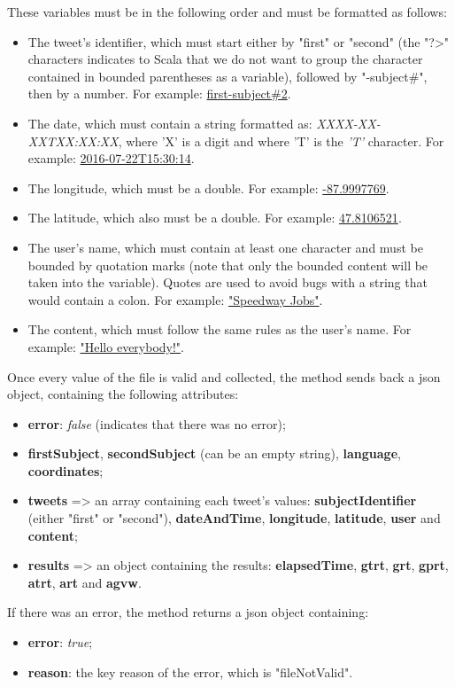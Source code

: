 \documentclass[a4paper,11pt]{report}
\begin{document}
These variables must be in the following order and must be formatted as follows:
\begin{itemize}
	\item The tweet's identifier, which must start either by "first" or "second" (the "?>" characters indicates to Scala that we do not want to group the character contained in bounded parentheses as a variable), followed by "-subject\#", then by a number. For example: \underline{first-subject\#2}.
	\item The date, which must contain a string formatted as: \emph{XXXX-XX-XXTXX:XX:XX}, where 'X' is a digit and where 'T' is the \emph{'T'} character. For example: \underline{2016-07-22T15:30:14}.
	\item The longitude, which must be a double. For example: \underline{-87.9997769}.
	\item The latitude, which also must be a double. For example: \underline{47.8106521}.
	\item The user's name, which must contain at least one character and must be bounded by quotation marks (note that only the bounded content will be taken into the variable). Quotes are used to avoid bugs with a string that would contain a colon. For example: \underline{"Speedway Jobs"}.
	\item The content, which must follow the same rules as the user's name. For example: \underline{"Hello everybody!"}.
\end{itemize}
\newpage

Once every value of the file is valid and collected, the method sends back a json object, containing the following attributes:
\begin{itemize}
	\item \textbf{error}: \emph{false} (indicates that there was no error);
	\item \textbf{firstSubject}, \textbf{secondSubject} (can be an empty string), \textbf{language}, \textbf{coordinates};
	\item \textbf{tweets} => an array containing each tweet's values: \textbf{subjectIdentifier} (either "first" or "second"), \textbf{dateAndTime}, \textbf{longitude}, \textbf{latitude}, \textbf{user} and \textbf{content};
	\item \textbf{results} => an object containing the results: \textbf{elapsedTime}, \textbf{gtrt}, \textbf{grt}, \textbf{gprt}, \textbf{atrt}, \textbf{art} and \textbf{agvw}.
\end{itemize}

If there was an error, the method returns a json object containing:
\begin{itemize}
	\item \textbf{error}: \emph{true};
	\item \textbf{reason}: the key reason of the error, which is "fileNotValid".
\end{itemize}
\end{document}
